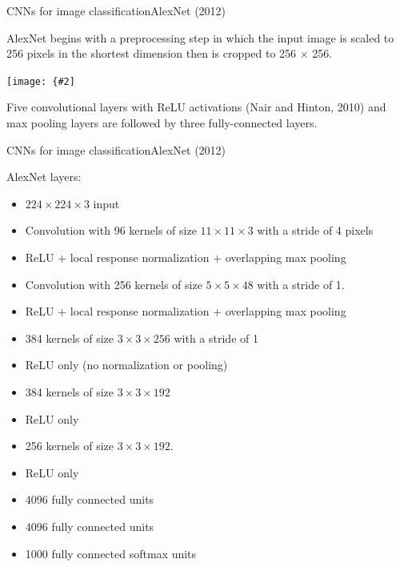 \documentclass{beamer}
\newcommand{\myfig}[3]{\centerline{\texttt{[image: \{\#2]}}}
\begin{document}
\begin{frame}{CNNs for image classification}{AlexNet (2012)}

  AlexNet begins with a preprocessing step in which the input image is
  scaled to 256 pixels in the shortest dimension then is cropped to
  256 $\times$ 256.

  \medskip

  \myfig{4.5in}{alexnet-fig2}{Krizhevsky, Sutskever, and Hinton,
    (2012), Fig.\ 2}

  \medskip

  Five convolutional layers with ReLU activations (Nair and Hinton,
  2010) and max pooling layers are followed by three fully-connected
  layers.

\end{frame}


\begin{frame}{CNNs for image classification}{AlexNet (2012)}

  AlexNet layers:
  \begin{itemize}
  \item $224 \times 224 \times 3$ input
  \item Convolution with 96 kernels of size $11 \times 11 \times 3$ with a stride of 4 pixels
  \item ReLU + local response normalization + overlapping max pooling
  \item Convolution with 256 kernels of size $5\times 5\times 48$ with a stride of 1.
  \item ReLU + local response normalization + overlapping max pooling
  \item 384 kernels of size $3\times 3\times 256$ with a stride of 1
  \item ReLU only (no normalization or pooling)
  \item 384 kernels of size $3\times 3\times 192$
  \item ReLU only
  \item 256 kernels of size $3\times 3\times 192$.
  \item ReLU only
  \item 4096 fully connected units
  \item 4096 fully connected units
  \item 1000 fully connected softmax units
  \end{itemize}
  
\end{frame}
\end{document}

